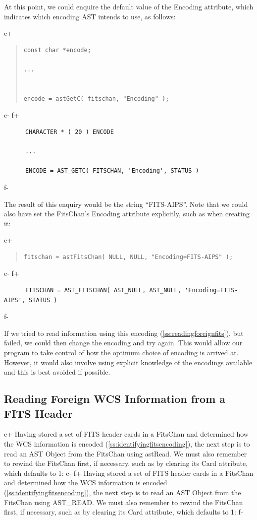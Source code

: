 \documentclass[twoside,11pt]{article}
\newcommand{\secref}[1]{\S\ref{#1}}
\renewcommand{\secref}[1]{\ref{#1}}
\begin{document}
At this point, we could enquire the default value of the Encoding
attribute, which indicates which encoding AST intends to use, as
follows:

c+
\begin{quote}
\small
\begin{verbatim}
const char *encode;

...


encode = astGetC( fitschan, "Encoding" );
\end{verbatim}
\normalsize
\end{quote}
c-
f+
\small
\begin{verbatim}
      CHARACTER * ( 20 ) ENCODE

      ...

      ENCODE = AST_GETC( FITSCHAN, 'Encoding', STATUS )
\end{verbatim}
\normalsize
f-

The result of this enquiry would be the string ``FITS-AIPS''.  Note
that we could also have set the FitsChan's Encoding attribute
explicitly, such as when creating it:

c+
\begin{quote}
\small
\begin{verbatim}
fitschan = astFitsChan( NULL, NULL, "Encoding=FITS-AIPS" );
\end{verbatim}
\normalsize
\end{quote}
c-
f+
\small
\begin{verbatim}
      FITSCHAN = AST_FITSCHAN( AST_NULL, AST_NULL, 'Encoding=FITS-AIPS', STATUS )
\end{verbatim}
\normalsize
f-

If we tried to read information using this encoding
(\secref{ss:readingforeignfits}), but failed, we could then change the
encoding and try again.  This would allow our program to take control
of how the optimum choice of encoding is arrived at. However, it would
also involve using explicit knowledge of the encodings available and
this is best avoided if possible.

\subsection{\label{ss:readingforeignfits}Reading Foreign WCS Information from a FITS Header}

c+
Having stored a set of FITS header cards in a FitsChan and determined
how the WCS information is encoded
(\secref{ss:identifyingfitsencoding}), the next step is to read an AST
Object from the FitsChan using astRead. We must also remember to
rewind the FitsChan first, if necessary, such as by clearing its Card
attribute, which defaults to 1:
c-
f+
Having stored a set of FITS header cards in a FitsChan and determined
how the WCS information is encoded
(\secref{ss:identifyingfitsencoding}), the next step is to read an AST
Object from the FitsChan using AST\_READ. We must also remember to
rewind the FitsChan first, if necessary, such as by clearing its Card
attribute, which defaults to 1:
f-
\end{document}
